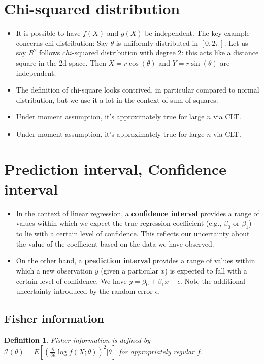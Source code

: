 \documentclass[11pt,reqno]{amsart}
\newtheorem{definition}{Definition}
\theoremstyle{remark}
\begin{document}
\section{Chi-squared distribution}
\begin{itemize}
\item It is possible to have $f(X)$ and $g(X)$ be independent. The key example concerns chi-distribution: Say $\theta$ is uniformly distributed in $[0,2\pi]$. 
Let us say $R^2$ follows $chi$-squared distribution with degree 2: this acts like a distance square in the 2d space. Then $X= r\cos(\theta)$ and $Y=r\sin(\theta)$ are independent.
\item The definition of chi-square looks contrived, in particular compared to normal distribution, but we use it a lot in the context of sum of squares.
\item Under moment assumption, it's approximately true for large $n$ via CLT.
\item Under moment assumption, it's approximately true for large $n$ via CLT.
\end{itemize}


\section{Prediction interval, Confidence interval}
\begin{itemize}
\item In the context of linear regression, a \textbf{confidence interval} provides a range of values within which we expect the true regression coefficient (e.g., $ \beta_0 $ or $ \beta_1 $) to lie with a certain level of confidence. This reflects our uncertainty about the 
value of the coefficient based on the data we have observed.
\item On the other hand, a \textbf{prediction interval} provides a range of values within which a new observation $ y $ (given a particular $ x $) is expected to fall with a certain level of confidence.
We have $y=\beta_0+\beta_1 x+\epsilon$. Note the additional uncertainty introduced by the random error $\epsilon$.
\end{itemize}

\subsection{Fisher information}
\begin{definition}
Fisher information is defined by $\mathcal{I}(\theta)=E[(\frac \partial{\partial\theta}\log f(X;\theta))^2|\theta]$ for appropriately regular $f$.
\end{definition}
\end{document}
